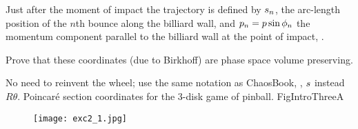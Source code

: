 {Just after
the moment of impact the trajectory  is defined by $s_n$, the arc-length
position of the $n$th bounce along the billiard wall, and
$p_n= p \sin \phi_n$
the momentum component parallel to the billiard wall
at the point of impact,
.

Prove that these coordinates (due to Birkhoff)
are phase space volume
preserving. 

No need to reinvent the wheel; 
use the same notation as ChaosBook, \ie, $s$ instead
$R \theta$. 
%
 {}{ Poincar\'e section coordinates for the
3-disk game of pinball.
    }{FigIntroThreeA}
%
}

\begin{figure}
\centering
\texttt{[image: exc2\_1.jpg]}
\end{figure}


